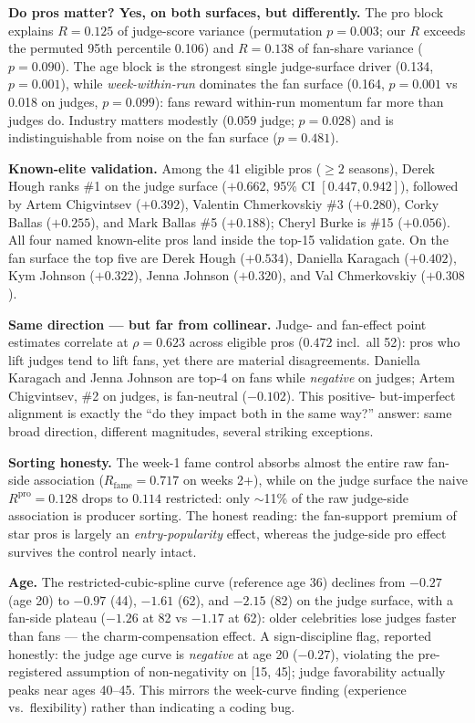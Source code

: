 \documentclass[11pt]{article}
\begin{document}
\textbf{Do pros matter? Yes, on both surfaces, but differently.} The pro block
explains $R = 0.125$ of judge-score variance (permutation $p = 0.003$; our $R$
exceeds the permuted 95th percentile 0.106) and $R = 0.138$ of fan-share variance
($p = 0.090$). The age block is the strongest single judge-surface driver (0.134,
$p=0.001$), while \emph{week-within-run} dominates the fan surface (0.164, $p =
0.001$ vs 0.018 on judges, $p=0.099$): fans reward within-run momentum far more
than judges do. Industry matters modestly (0.059 judge; $p = 0.028$) and is
indistinguishable from noise on the fan surface ($p = 0.481$).

\textbf{Known-elite validation.} Among the 41 eligible pros ($\ge 2$ seasons),
Derek Hough ranks \#1 on the judge surface ($+0.662$, 95\% CI $[0.447, 0.942]$),
followed by Artem Chigvintsev ($+0.392$), Valentin Chmerkovskiy \#3 ($+0.280$),
Corky Ballas ($+0.255$), and Mark Ballas \#5 ($+0.188$); Cheryl Burke is \#15
($+0.056$). All four named known-elite pros land inside the top-15 validation
gate. On the fan surface the top five are Derek Hough ($+0.534$), Daniella
Karagach ($+0.402$), Kym Johnson ($+0.322$), Jenna Johnson ($+0.320$), and Val
Chmerkovskiy ($+0.308$).

\textbf{Same direction --- but far from collinear.} Judge- and fan-effect point
estimates correlate at $\rho = 0.623$ across eligible pros ($0.472$ incl.\ all 52):
pros who lift judges tend to lift fans, yet there are material disagreements.
Daniella Karagach and Jenna Johnson are top-4 on fans while \emph{negative} on
judges; Artem Chigvintsev, \#2 on judges, is fan-neutral ($-0.102$). This positive-
but-imperfect alignment is exactly the ``do they impact both in the same way?''
answer: same broad direction, different magnitudes, several striking exceptions.

\textbf{Sorting honesty.} The week-1 fame control absorbs almost the entire raw
fan-side association ($R_{\text{fame}} = 0.717$ on weeks 2+), while on the judge
surface the naive $R^{\text{pro}} = 0.128$ drops to $0.114$ restricted: only
$\sim$11\% of the raw judge-side association is producer sorting. The honest reading:
the fan-support premium of star pros is largely an \emph{entry-popularity} effect,
whereas the judge-side pro effect survives the control nearly intact.

\textbf{Age.} The restricted-cubic-spline curve (reference age 36) declines from
$-0.27$ (age 20) to $-0.97$ (44), $-1.61$ (62), and $-2.15$ (82) on the judge
surface, with a fan-side plateau ($-1.26$ at 82 vs $-1.17$ at 62): older celebrities
lose judges faster than fans --- the charm-compensation effect. A sign-discipline
flag, reported honestly: the judge age curve is \emph{negative} at age 20
($-0.27$), violating the pre-registered assumption of non-negativity on [15, 45];
judge favorability actually peaks near ages 40--45. This mirrors the week-curve
finding (experience vs.\ flexibility) rather than indicating a coding bug.
\end{document}

